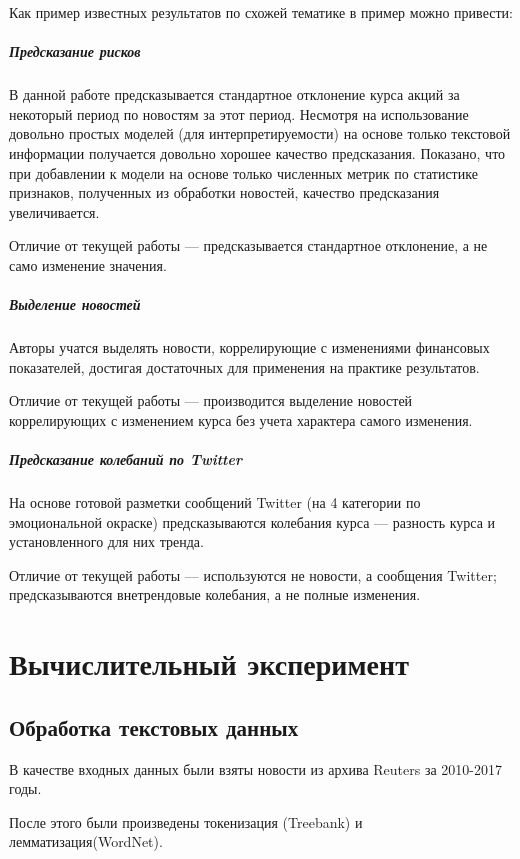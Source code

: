 \documentclass[pdftex,ptm,12pt,a4paper]{report}
\begin{document}
\fi

Как пример известных результатов по схожей тематике в пример можно привести:

\paragraph{Предсказание рисков \cite{risk_predict}}

В данной работе предсказывается стандартное отклонение курса акций за некоторый период по новостям за этот период.
Несмотря на использование довольно простых моделей (для интерпретируемости) на основе только текстовой информации получается
довольно хорошее качество предсказания. Показано, что при добавлении к модели на основе только численных метрик по статистике
 признаков, полученных из обработки новостей, качество предсказания увеличивается.

Отличие от текущей работы --- предсказывается стандартное отклонение, а не само изменение значения.

\paragraph{Выделение новостей \cite{select_important_news}}

Авторы учатся выделять новости, коррелирующие с изменениями финансовых показателей, достигая достаточных для
применения на практике результатов.

Отличие от текущей работы --- производится выделение новостей коррелирующих с изменением курса без учета характера
самого изменения.

\paragraph{Предсказание колебаний по Twitter \cite{stock_from_twitter}}

На основе готовой разметки сообщений Twitter (на 4 категории по эмоциональной окраске) предсказываются колебания курса --- разность курса и установленного для них тренда.

Отличие от текущей работы --- используются не новости, а сообщения Twitter; предсказываются внетрендовые колебания,
а не полные изменения.

\chapter{Вычислительный эксперимент}

\section{Обработка текстовых данных}

В качестве входных данных были взяты новости из архива Reuters за 2010-2017 годы.

После этого были произведены токенизация (Treebank\cite{treebank}) и лемматизация(WordNet\cite{wordnet}).



{}

\end{document}
